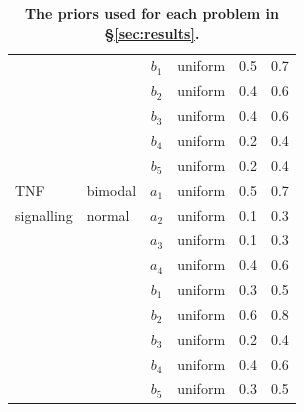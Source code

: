 \begin{table}[H]
\begin{adjustwidth}{0in}{0in}
\begin{tabularx}{1.0\textwidth}{llclcc}
&& $b_1$ & uniform & 0.5 & 0.7\\
&& $b_2$ & uniform & 0.4 & 0.6\\
&& $b_3$ & uniform & 0.4 & 0.6\\
&& $b_4$ & uniform & 0.2 & 0.4\\
&& $b_5$ & uniform & 0.2 & 0.4\\
\toprule
TNF  & bimodal  & $a_1$ & uniform & 0.5 & 0.7\\
signalling& normal & $a_2$ & uniform & 0.1 & 0.3\\
&& $a_3$ & uniform & 0.1 & 0.3\\
&& $a_4$ & uniform & 0.4 & 0.6\\
&& $b_1$ & uniform & 0.3 & 0.5\\
&& $b_2$ & uniform & 0.6 & 0.8\\
&& $b_3$ & uniform & 0.2 & 0.4\\
&& $b_4$ & uniform & 0.4 & 0.6\\
&& $b_5$ & uniform & 0.3 & 0.5\\
\end{tabularx}
\caption{\textbf{The priors used for each problem in \S\ref{sec:results}.}}
\label{tab:priors}
\end{adjustwidth}
\end{table}
